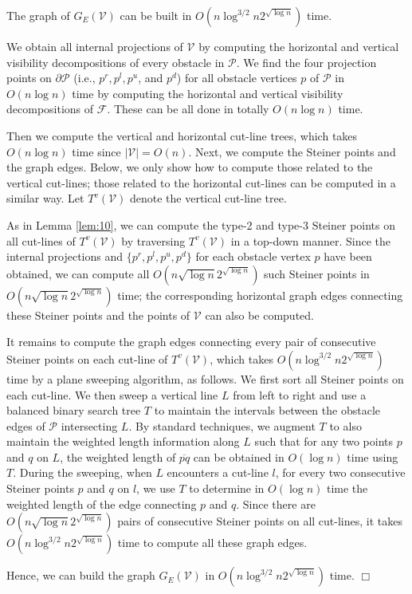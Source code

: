 \documentclass[english,runningheads,11pt]{llncs}
\def\calP{\mathcal{P}}
\def\calF{\mathcal{F}}
\def\calV{\mathcal{V}}
\newenvironment{proof}{\noindent {\textbf{Proof:}}\rm}{\hfill $\Box$\rm}
\begin{document}
\begin{lemma}\label{lem:200}
The graph of $G_E(\calV)$ can be built in $O(n\log^{3/2}n2^{\sqrt{\log n}})$
time.
\end{lemma}
\begin{proof}
We obtain all internal projections of $\calV$ by computing the
horizontal and vertical visibility decompositions of every
obstacle in $\calP$. We find the four projection points on $\partial\calP$ (i.e., $p^r,p^l,p^u$,
and $p^d$) for all obstacle vertices $p$ of $\calP$ in $O(n\log n)$ time by
computing the horizontal and vertical visibility decompositions of $\calF$.
These can be all done in totally $O(n\log n)$ time.

Then we compute the vertical and horizontal cut-line trees, which takes
$O(n\log n)$ time since $|\calV|=O(n)$. Next, we compute
the Steiner points and the graph edges. Below, we only show how to compute those
related to the vertical cut-lines; those related to the horizontal
cut-lines can be computed in a similar way.
Let $T^v(\calV)$ denote the vertical cut-line tree.

As in Lemma \ref{lem:10}, we can compute the type-2 and type-3 Steiner
points on all cut-lines of $T^v(\calV)$ by traversing $T^v(\calV)$ in a top-down
manner. Since the internal projections and $\{p^r,p^l,p^u,p^d\}$ for
each obstacle vertex $p$ have been obtained, we can compute all
$O(n\sqrt{\log n}2^{\sqrt{\log n}})$ such Steiner points in $O(n\sqrt{\log
n}2^{\sqrt{\log n}})$ time; the corresponding horizontal graph
edges connecting these Steiner points and the points of $\calV$ can
also be computed.


It remains to compute the graph edges connecting every pair of consecutive Steiner points
on each cut-line of $T^v(\calV)$, which takes $O(n\log^{3/2} n2^{\sqrt{\log n}})$ time by a
plane sweeping algorithm, as follows. We first sort all Steiner points on each cut-line.
We then sweep a vertical line $L$ from left to
right and use a balanced binary search tree $T$ to maintain the
intervals between the obstacle edges of $\calP$ intersecting $L$. By standard
techniques, we augment $T$ to also maintain the weighted length
information along $L$ such that for any two points $p$ and $q$ on
$L$, the weighted length of $\overline{pq}$ can
be obtained in $O(\log n)$ time using $T$. During the sweeping,
when $L$ encounters a cut-line $l$, for every two consecutive Steiner
points $p$ and $q$ on $l$, we use $T$ to determine in $O(\log n)$ time the weighted
length of the edge connecting $p$ and $q$.
Since there are $O(n\sqrt{\log n} 2^{\sqrt{\log
n}})$ pairs of consecutive Steiner points on all cut-lines, it takes
$O(n\log^{3/2} n2^{\sqrt{\log n}})$ time to compute all these graph edges.

Hence, we can build the graph $G_E(\calV)$ in $O(n\log^{3/2} n2^{\sqrt{\log n}})$ time.
\end{proof}
\end{document}
